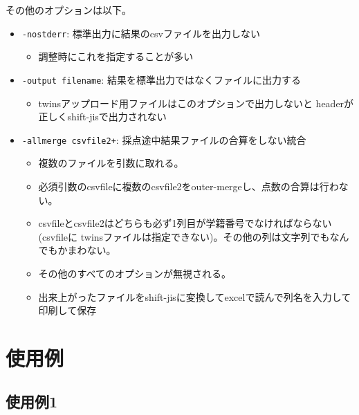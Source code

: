 その他のオプションは以下。

\begin{itemize}
\item \texttt{-nostderr}: 標準出力に結果のcsvファイルを出力しない

\begin{itemize}
\item 調整時にこれを指定することが多い

\end{itemize}

\item \texttt{-output filename}: 結果を標準出力ではなくファイルに出力する

\begin{itemize}
\item twinsアップロード用ファイルはこのオプションで出力しないと
headerが正しくshift-jisで出力されない

\end{itemize}

\item \texttt{-allmerge csvfile2+}: 採点途中結果ファイルの合算をしない統合

\begin{itemize}
\item 複数のファイルを引数に取れる。

\item 必須引数のcsvfileに複数のcsvfile2をouter-mergeし、点数の合算は行わない。

\item csvfileとcsvfile2はどちらも必ず1列目が学籍番号でなければならない(csvfileに
twinsファイルは指定できない)。その他の列は文字列でもなんでもかまわない。

\item その他のすべてのオプションが無視される。

\item 出来上がったファイルをshift-jisに変換してexcelで読んで列名を入力して印刷して保存\smiley 

\end{itemize}

\end{itemize}

\section{使用例}
\label{使用例}

\subsection{使用例1}
\label{使用例1}

